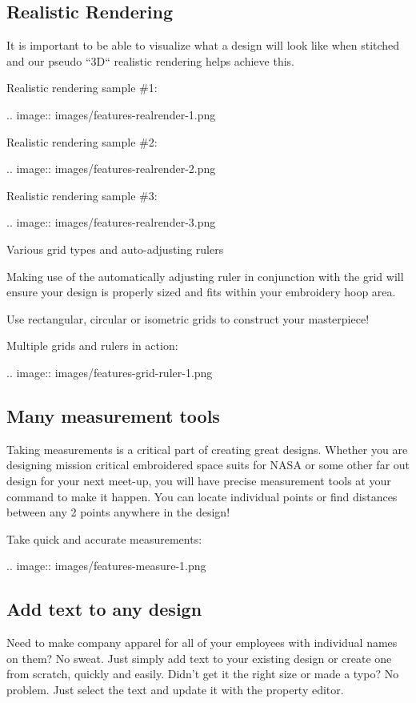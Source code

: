 \documentclass[10pt]{report}
\begin{document}
\subsection{Realistic Rendering}

It is important to be able to visualize what a design will look like when stitched and our pseudo ``3D`` realistic rendering helps achieve this.

Realistic rendering sample \#1:

.. image::
   images/features-realrender-1.png

Realistic rendering sample \#2:

.. image::
   images/features-realrender-2.png

Realistic rendering sample \#3:

.. image::
   images/features-realrender-3.png

Various grid types and auto-adjusting rulers

Making use of the automatically adjusting ruler in conjunction with the grid will ensure your design is properly sized and fits within your embroidery hoop area.

Use rectangular, circular or isometric grids to construct your masterpiece!

Multiple grids and rulers in action:

.. image::
   images/features-grid-ruler-1.png

\subsection{Many measurement tools}

Taking measurements is a critical part of creating great designs. Whether you are designing mission critical embroidered space suits for NASA or some other far out design for your next meet-up, you will have precise measurement tools at your command to make it happen. You can locate individual points or find distances between any 2 points anywhere in the design!

Take quick and accurate measurements:

.. image::
   images/features-measure-1.png

\subsection{Add text to any design}

Need to make company apparel for all of your employees with individual names on them? No sweat. Just simply add text to your existing design or create one from scratch, quickly and easily.
Didn't get it the right size or made a typo? No problem. Just select the text and update it with the property editor.
\end{document}
